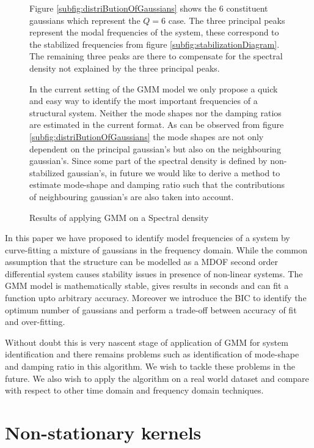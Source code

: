 \begin{figure}[!ht]
Figure \ref{subfig:distriButionOfGaussians} shows the $6$ constituent gaussians which represent the $Q=6$ case. The three principal peaks represent the modal frequencies of the system, these correspond to the stabilized frequencies from figure \ref{subfig:stabilizationDiagram}. The remaining three peaks are there to compensate for the spectral density not explained by the three principal peaks. 

In the current setting of the GMM model we only propose a quick and easy way to identify the most important frequencies of a structural system. Neither the mode shapes nor the damping ratios are estimated in the current format. As can be observed from figure \ref{subfig:distriButionOfGaussians} the mode shapes are not only dependent on the principal gaussian's but also on the neighbouring gaussian's. Since some part of the spectral density is defined by non-stabilized gaussian's, in future we would like to derive a method to estimate mode-shape and damping ratio such that the contributions of neighbouring gaussian's are also taken into account.
  
  \caption{Results of applying GMM on a Spectral density}
\end{figure}

In this paper we have proposed to identify model frequencies of a system by curve-fitting a mixture of gaussians in the frequency domain. While the common assumption that the structure can be modelled as a MDOF second order differential system causes stability issues in presence of non-linear systems. The GMM model is mathematically stable, gives results in seconds and can fit a function upto arbitrary accuracy. Moreover we introduce the BIC to identify the optimum number of gaussians and perform a trade-off between accuracy of fit and over-fitting. 

Without doubt this is very nascent stage of application of GMM for system identification and there remains problems such as identification of mode-shape and damping ratio in this algorithm. We wish to tackle these problems in the future. We also wish to apply the algorithm on a real world dataset and compare with respect to other time domain and frequency domain techniques.



\section{Non-stationary kernels}\label{nonStationaryKernels}



